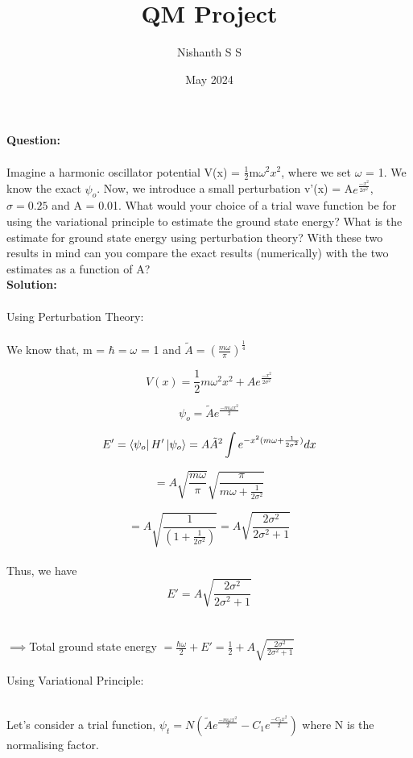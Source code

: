 \documentclass[12pt]{article}
\title{QM Project}
\author{Nishanth S S}
\date{May 2024}
\begin{document}
\maketitle

\noindent
\textbf{Question:}
\\
\\
Imagine a harmonic oscillator potential V(x) = 
$\frac{1}{2}$m$\omega^2 x^{2}$, where we set $\omega$ = 1. We know the exact $\psi_o$. Now, we 
introduce a small perturbation v'(x) = A$e^\frac{-x^2}{2\sigma^2}$,  $\sigma = 0.25$ and A = 0.01. 
What would your choice of a trial wave function be for using the variational principle to estimate 
the ground state energy? What is the estimate for ground state energy using perturbation theory? 
With these two results in mind can you compare the exact results (numerically) with the two estimates as a function of A? 
\\

\noindent
\textbf{Solution:}
\\
\\
Using Perturbation Theory:
\\
\\
We know that, m = $\hbar = \omega$ = 1 and $\tilde{A} = (\frac{m \omega}{\pi})^\frac{1}{4}$

\[ V(x) = \frac{1}{2}m\omega^2 x^{2} + A e^{\frac{-x^2}{2\sigma^2}} \]

\[ \psi_o = \tilde{A} e^{\frac{-m \omega x^2}{2}} \]

\[ E' = \bra{\psi_o} H' \ket{\psi_o} = A\tilde{A}^2 \int e^{-x^2(m \omega + \frac{1}{2 \sigma^2})}  dx \]

\[ = A \sqrt{\frac{m \omega}{\pi}} \sqrt{\frac{\pi}{m \omega + \frac{1}{2 \sigma^2}}} \]

\[ = A \sqrt{\frac{1}{(1 + \frac{1}{2 \sigma^2})}} = A \sqrt{\frac{2 \sigma^2}{2 \sigma^2 + 1}} \]
\\

Thus, we have \[E' = A \sqrt{\frac{2 \sigma^2}{2 \sigma^2 + 1}} \]
\\
\\
\( \implies \)Total ground state energy $= \frac{\hbar \omega}{2} + E' = \frac{1}{2} + A \sqrt{\frac{2 \sigma^2}{2 \sigma^2 + 1}} $

\vspace{2 cm}

\newpage
Using Variational Principle:

\noindent
\\
Let's consider a trial function, $\psi_t = N(\tilde{A}e^{\frac{-m \omega x^2}{2}} - C_1e^{\frac{-C_2 x^2}{2}})$ where N is the normalising factor. 
\end{document}
